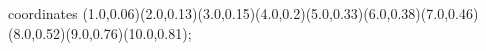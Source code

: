 					coordinates { (1.0,0.06)(2.0,0.13)(3.0,0.15)(4.0,0.2)(5.0,0.33)(6.0,0.38)(7.0,0.46)(8.0,0.52)(9.0,0.76)(10.0,0.81)};